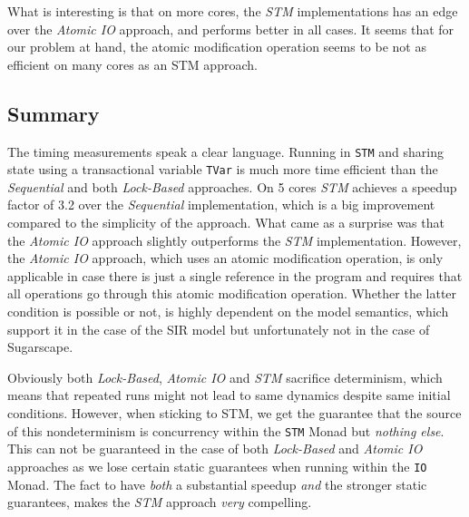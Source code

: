 What is interesting is that on more cores, the \textit{STM} implementations has an edge over the \textit{Atomic IO} approach, and performs better in all cases. It seems that for our problem at hand, the atomic modification operation seems to be not as efficient on many cores as an STM approach. 

%

\subsection{Summary}
The timing measurements speak a clear language. Running in \texttt{STM} and sharing state using a transactional variable \texttt{TVar} is much more time efficient than the \textit{Sequential} and both \textit{Lock-Based} approaches. On 5 cores \textit{STM} achieves a speedup factor of 3.2 over the \textit{Sequential} implementation, which is a big improvement compared to the simplicity of the approach. What came as a surprise was that the \textit{Atomic IO} approach slightly outperforms the \textit{STM} implementation. However, the \textit{Atomic IO} approach, which uses an atomic modification operation, is only applicable in case there is just a single reference in the program and requires that all operations go through this atomic modification operation. Whether the latter condition is possible or not, is highly dependent on the model semantics, which support it in the case of the SIR model but unfortunately not in the case of Sugarscape.

Obviously both \textit{Lock-Based}, \textit{Atomic IO} and \textit{STM} sacrifice determinism, which means that repeated runs might not lead to same dynamics despite same initial conditions. However, when sticking to STM, we get the guarantee that the source of this nondeterminism is concurrency within the \texttt{STM} Monad but \textit{nothing else}. This can not be guaranteed in the case of both \textit{Lock-Based} and \textit{Atomic IO} approaches as we lose certain static guarantees when running within the \texttt{IO} Monad. The fact to have \textit{both} a substantial speedup \textit{and} the stronger static guarantees, makes the \textit{STM} approach \textit{very} compelling.